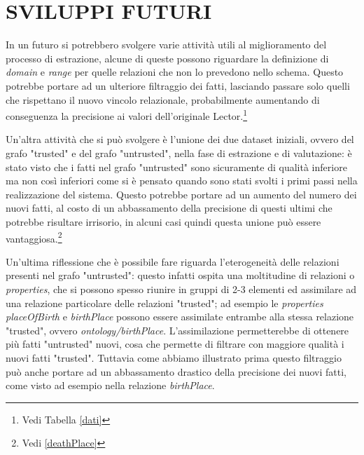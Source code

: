 \documentclass[10pt,a4paper,twocolumn]{article}
\begin{document}
\section{SVILUPPI FUTURI}

In un futuro si potrebbero svolgere varie attività utili al miglioramento del processo di estrazione, alcune di queste possono riguardare la definizione di \textit{domain} e \textit{range} per quelle relazioni che non lo prevedono nello schema. Questo potrebbe portare ad un ulteriore filtraggio dei fatti, lasciando passare solo quelli che rispettano il nuovo vincolo relazionale, probabilmente aumentando di conseguenza la precisione ai valori dell'originale Lector.\footnote{Vedi Tabella \ref{dati}}

Un'altra attività che si può svolgere è l'unione dei due dataset iniziali, ovvero del grafo "trusted" e del grafo "untrusted", nella fase di estrazione e di valutazione: è stato visto che i fatti nel grafo "untrusted" sono sicuramente di qualità inferiore ma non così inferiori come si è pensato quando sono stati svolti i primi passi nella realizzazione del sistema. Questo potrebbe portare ad un aumento del numero dei nuovi fatti, al costo di un abbassamento della precisione di questi ultimi che potrebbe risultare irrisorio, in alcuni casi quindi questa unione può essere vantaggiosa.\footnote{Vedi \ref{deathPlace}}

Un'ultima riflessione che è possibile fare riguarda l'eterogeneità delle relazioni presenti nel grafo "untrusted": questo infatti ospita una moltitudine di relazioni o \textit{properties}, che si possono spesso riunire in gruppi di 2-3 elementi ed assimilare ad una relazione particolare delle relazioni "trusted"; ad esempio le \textit{properties} \textit{placeOfBirth} e \textit{birthPlace} possono essere assimilate entrambe alla stessa relazione "trusted", ovvero \textit{ontology/birthPlace}. L'assimilazione permetterebbe di ottenere più fatti "untrusted" nuovi, cosa che permette di filtrare con maggiore qualità i nuovi fatti "trusted". Tuttavia come abbiamo illustrato prima questo filtraggio può anche portare ad un abbassamento drastico della precisione dei nuovi fatti, come visto ad esempio nella relazione \textit{birthPlace}.
\end{document}
